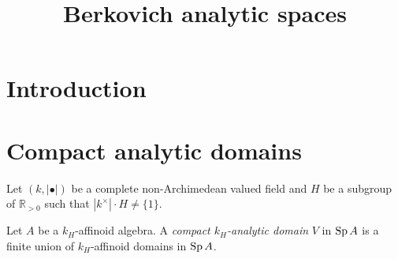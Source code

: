 
\title{Berkovich analytic spaces}

\maketitle
\tableofcontents



\section{Introduction}\label{sec-introduction}

\section{Compact analytic domains}
Let $(k,|\bullet|)$ be a complete non-Archimedean valued field and $H$ be a subgroup of $\mathbb{R}_{>0}$ such that $|k^{\times}|\cdot H\neq \{1\}$.

\begin{definition}
Let $A$ be a $k_H$-affinoid algebra. A \emph{compact $k_H$-analytic domain} $V$ in $\operatorname{Sp} A$ is a finite union of $k_H$-affinoid domains in $\operatorname{Sp} A$.    
\end{definition}


